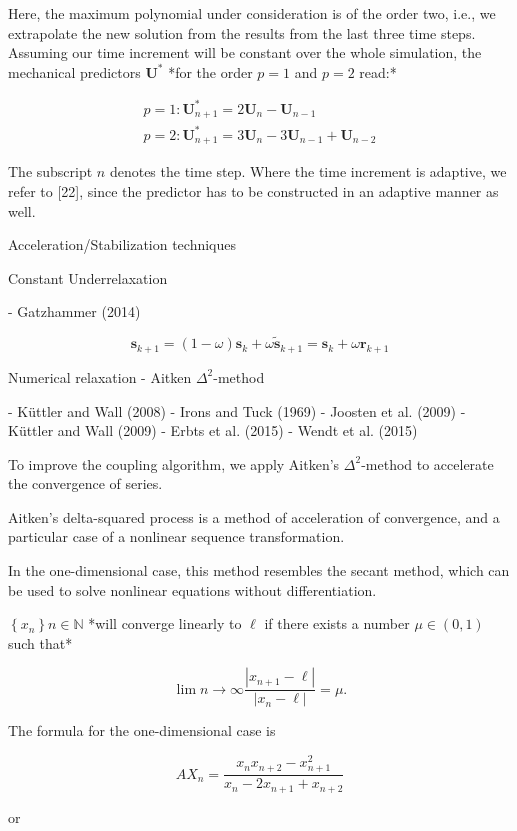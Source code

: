 Here, the maximum polynomial under consideration is of the order two, i.e., we extrapolate the new solution from the results from the last three time steps. Assuming our time increment will be constant over the whole simulation, the mechanical predictors $\mathbf{U}^{*}$ *for the order $p=1$ and $p=2$ read:*

$$
\begin{array}{l}
p=1: \mathbf{U}_{n+1}^{*}=2 \mathbf{U}_{n}-\mathbf{U}_{n-1} \\
p=2: \mathbf{U}_{n+1}^{*}=3 \mathbf{U}_{n}-3 \mathbf{U}_{n-1}+\mathbf{U}_{n-2}
\end{array}
$$

The subscript $n$ denotes the time step. Where the time increment is adaptive, we refer to [22], since the predictor has to be constructed in an adaptive manner as well.

 Acceleration/Stabilization techniques

 Constant Underrelaxation

- Gatzhammer (2014)

$$
\boldsymbol{s}_{k+1}=(1-\omega) \boldsymbol{s}_{k}+\omega \tilde{\boldsymbol{s}}_{k+1}=\boldsymbol{s}_{k}+\omega \boldsymbol{r}_{k+1}
$$

 Numerical relaxation - Aitken $\Delta^2$-method

- Küttler and Wall (2008)
- Irons and Tuck (1969)
- Joosten et al. (2009)
- Küttler and Wall (2009)
- Erbts et al. (2015)
- Wendt et al. (2015)

To improve the coupling algorithm, we apply Aitken's $\Delta^{2}$-method to accelerate the  convergence of series.

Aitken's delta-squared process is a method of acceleration of convergence, and a particular case of a nonlinear sequence transformation.

In the one-dimensional case, this method resembles the secant method, which can be used to solve nonlinear equations without differentiation.

$\left\{x_{n}\right\}{n \in \mathbb{N}}$ *will converge linearly to $\ell$ if there exists a number $\mu \in(0,1)$ such that*

$$
\lim {n \rightarrow \infty} \frac{\left|x_{n+1}-\ell\right|}{\left|x_{n}-\ell\right|}=\mu .
$$

The formula for the one-dimensional case is

$$
AX_n = \frac{x_n x_{n+2} - x_{n+1}^2}{x_n-2x_{n+1}+ x_{n+2} }
$$

or

